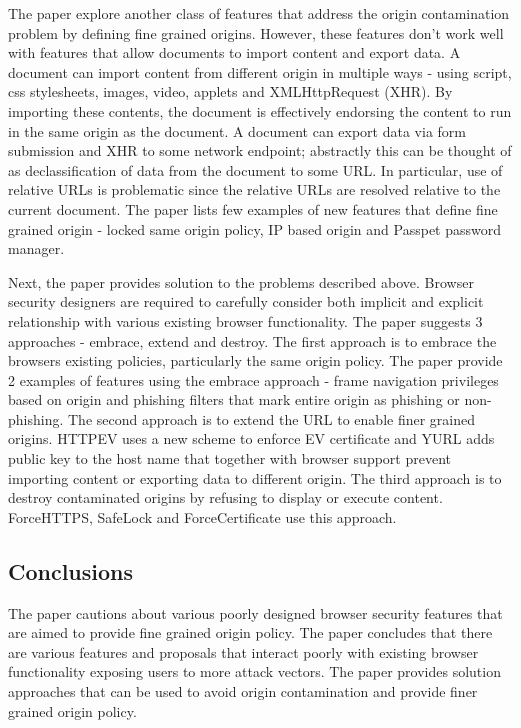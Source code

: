\documentclass[12pt]{article}
\begin{document}
    The paper explore another class of features that address the origin contamination problem by defining fine grained origins. However, these features don't work well with features that allow documents to import content and export data. A document can import content from different origin in multiple ways - using script, css stylesheets, images, video, applets and XMLHttpRequest (XHR). By importing these contents, the document is effectively endorsing the content to run in the same origin as the document. A document can export data via form submission and XHR to some network endpoint; abstractly this can be thought of as declassification of data from the document to some URL. In particular, use of relative URLs is problematic since the relative URLs are resolved relative to the current document. The paper lists few examples of new features that define fine grained origin - locked same origin policy, IP based origin and Passpet password manager.

    Next, the paper provides solution to the problems described above. Browser security designers are required to carefully consider both implicit and explicit relationship with various existing browser functionality. The paper suggests 3 approaches - embrace, extend and destroy. The first approach is to embrace the browsers existing policies, particularly the same origin policy. The paper provide 2 examples of features using the embrace approach - frame navigation privileges based on origin and phishing filters that mark entire origin as phishing or non-phishing. The second approach is to extend the URL to enable finer grained origins. HTTPEV uses a new scheme to enforce EV certificate and YURL adds public key to the host name that together with browser support prevent importing content or exporting data to different origin. The third approach is to destroy contaminated origins by refusing to display or execute content. ForceHTTPS, SafeLock and ForceCertificate use this approach.
    
    \subsection*{Conclusions}
    The paper cautions about various poorly designed browser security features that are aimed to provide fine grained origin policy. The paper concludes that there are various features and proposals that interact poorly with existing browser functionality exposing users to more attack vectors. The paper provides solution approaches that can be used to avoid origin contamination and provide finer grained origin policy.
\end{document}

